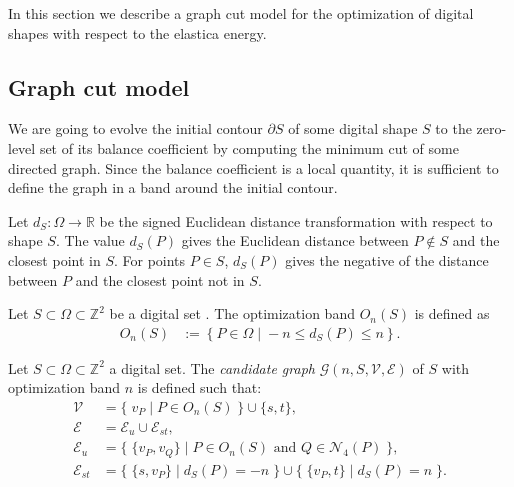\documentclass[review]{siamart220329}
\begin{document}
In this section we describe a graph cut model for the optimization of digital shapes with respect to the elastica energy.

 
\subsection{Graph cut model}\label{sec:graph-cut-model}

We are going to evolve the initial contour $\partial S$ of some
digital shape $S$ to the zero-level set of its balance coefficient by
computing the minimum cut of some directed graph. Since the balance
coefficient is a local quantity, it is sufficient to define the graph
in a band around the initial contour. 

Let $d_{S}:\Omega \rightarrow \mathbb{R}$ be the signed Euclidean distance transformation with respect to shape $S$. The value $d_{S}(P)$ gives the Euclidean distance between $P \notin S$ and the closest point in $S$. For points $P \in S$, $d_{S}(P)$ gives the negative of the distance between $P$ and the closest point not in $S$. 

\begin{definition}
Let $S \subset \Omega \subset \mathbb{Z}^2$ be a digital set
. The optimization band
$O_n(S)$ is defined as
%
%
\begin{align*}
	O_n(S) &:=\left\{ P \in \Omega \; | \; -n \leq d_{S}(P) \leq n \right\}.
\end{align*}
\end{definition}
%
%
\begin{definition}
Let $S \subset \Omega \subset \mathbb{Z}^2$ a digital set. The {\em candidate graph} $\mathcal{G}(n,S,\mathcal{V},\mathcal{E})$ of $S$ with optimization band $n$ is defined such that:
%
%
\begin{align*}
\mathcal{V} &= \big\{\; v_P \; | \; P \in O_n(S) \;\} \cup \{s,t \big\}, \\
\mathcal{E} &= \mathcal{E}_u \cup \mathcal{E}_{st}, \\
\mathcal{E}_u &= \big\{ \; \{v_P,v_Q\} \; | \; P \in O_n(S) \text{ and } Q \in \mathcal{N}_4(P) \; \big\}, \\
\mathcal{E}_{st} &= \big\{\; \{s,v_P\} \; | \; d_S(P)=-n \; \big\} \cup \big\{\; \{v_P,t\} \; | \; d_S(P)=n \; \big\}.
\end{align*}
%
%
\end{definition}
\end{document}
